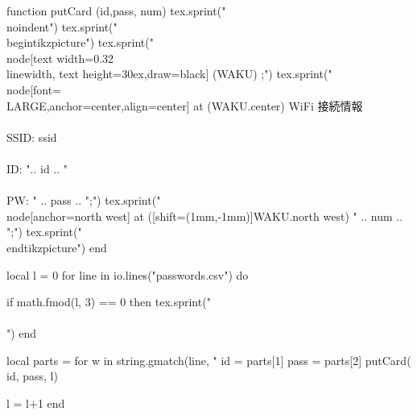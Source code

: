 \documentclass[a4paper]{ltjsarticle}
\begin{document}
\begin{luacode}
    function putCard (id,pass, num)
        tex.sprint("\\noindent")
        tex.sprint("\\begin{tikzpicture}")
        tex.sprint("\\node[text width=0.32\\linewidth, text height=30ex,draw=black] (WAKU) {};")
        tex.sprint("\\node[font=\\LARGE,anchor=center,align=center] at (WAKU.center) {WiFi 接続情報\\\\SSID: ssid \\\\ ID: ".. id .. "\\\\PW: " .. pass .. "};")
        tex.sprint("\\node[anchor=north west] at ([shift={(1mm,-1mm)}]WAKU.north west) {" .. num .. "};")
        tex.sprint("\\end{tikzpicture}")
    end

    local l = 0
    for line in io.lines("passwords.csv") do 

        if math.fmod(l, 3) == 0 then
            tex.sprint("\\\\")
        end

        local parts = {}
        for w in string.gmatch(line, "%
        id = parts[1]
        pass = parts[2]
        putCard( id, pass, l)

        l = l+1
    end
    

\end{luacode}
\end{document}
